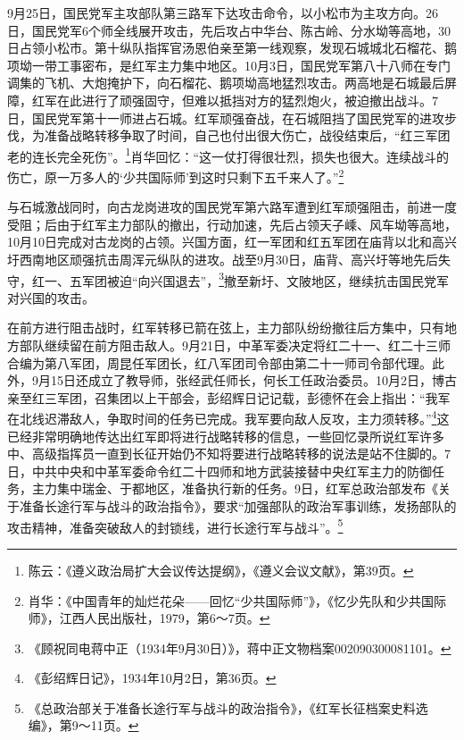9月25日，国民党军主攻部队第三路军下达攻击命令，以小松市为主攻方向。26日，国民党军6个师全线展开攻击，先后攻占中华台、陈古岭、分水坳等高地，30日占领小松市。第十纵队指挥官汤恩伯亲至第一线观察，发现石城城北石榴花、鹅项坳一带工事密布，是红军主力集中地区。10月3日，国民党军第八十八师在专门调集的飞机、大炮掩护下，向石榴花、鹅项坳高地猛烈攻击。两高地是石城最后屏障，红军在此进行了顽强固守，但难以抵挡对方的猛烈炮火，被迫撤出战斗。7日，国民党军第十一师进占石城。红军顽强奋战，在石城阻挡了国民党军的进攻步伐，为准备战略转移争取了时间，自己也付出很大伤亡，战役结束后，“红三军团老的连长完全死伤”。\footnote{陈云：《遵义政治局扩大会议传达提纲》，《遵义会议文献》，第39页。}肖华回忆：“这一仗打得很壮烈，损失也很大。连续战斗的伤亡，原一万多人的‘少共国际师’到这时只剩下五千来人了。”\footnote{肖华：《中国青年的灿烂花朵——回忆“少共国际师”》，《忆少先队和少共国际师》，江西人民出版社，1979，第6～7页。}


与石城激战同时，向古龙岗进攻的国民党军第六路军遭到红军顽强阻击，前进一度受阻；后由于红军主力部队的撤出，行动加速，先后占领天子嵊、风车坳等高地，10月10日完成对古龙岗的占领。兴国方面，红一军团和红五军团在庙背以北和高兴圩西南地区顽强抗击周浑元纵队的进攻。战至9月30日，庙背、高兴圩等地先后失守，红一、五军团被迫“向兴国退去”，\footnote{《顾祝同电蒋中正（1934年9月30日）》，蒋中正文物档案002090300081101。}撤至新圩、文陂地区，继续抗击国民党军对兴国的攻击。


在前方进行阻击战时，红军转移已箭在弦上，主力部队纷纷撤往后方集中，只有地方部队继续留在前方阻击敌人。9月21日，中革军委决定将红二十一、红二十三师合编为第八军团，周昆任军团长，红八军团司令部由第二十一师司令部代理。此外，9月15日还成立了教导师，张经武任师长，何长工任政治委员。10月2日，博古亲至红三军团，召集团以上干部会，彭绍辉日记记载，彭德怀在会上指出：“我军在北线迟滞敌人，争取时间的任务已完成。我军要向敌人反攻，主力须转移。”\footnote{《彭绍辉日记》，1934年10月2日，第36页。}这已经非常明确地传达出红军即将进行战略转移的信息，一些回忆录所说红军许多中、高级指挥员一直到长征开始仍不知将要进行战略转移的说法是站不住脚的。7日，中共中央和中革军委命令红二十四师和地方武装接替中央红军主力的防御任务，主力集中瑞金、于都地区，准备执行新的任务。9日，红军总政治部发布《关于准备长途行军与战斗的政治指令》，要求“加强部队的政治军事训练，发扬部队的攻击精神，准备突破敌人的封锁线，进行长途行军与战斗”。\footnote{《总政治部关于准备长途行军与战斗的政治指令》，《红军长征档案史料选编》，第9～11页。}


